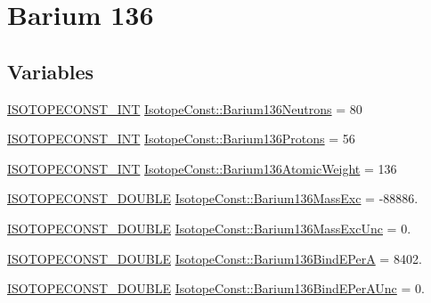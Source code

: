 \hypertarget{group___isotope_const-_barium-_ba136}{}\section{Barium 136}
\label{group___isotope_const-_barium-_ba136}
\subsection*{Variables}
\begin{DoxyCompactItemize}
\item 
\mbox{\hyperlink{group___isotope_const-_macros_ga5f18360b3e99483a35c32d789e62621c}{I\+S\+O\+T\+O\+P\+E\+C\+O\+N\+S\+T\+\_\+\+I\+NT}} \mbox{\hyperlink{group___isotope_const-_barium-_ba136_ga207ac0f945f2a6e0a3abf848dd1a6a09}{Isotope\+Const\+::\+Barium136\+Neutrons}} = 80
\item 
\mbox{\hyperlink{group___isotope_const-_macros_ga5f18360b3e99483a35c32d789e62621c}{I\+S\+O\+T\+O\+P\+E\+C\+O\+N\+S\+T\+\_\+\+I\+NT}} \mbox{\hyperlink{group___isotope_const-_barium-_ba136_ga65a9df2bdef9649c95465ae2739fdb09}{Isotope\+Const\+::\+Barium136\+Protons}} = 56
\item 
\mbox{\hyperlink{group___isotope_const-_macros_ga5f18360b3e99483a35c32d789e62621c}{I\+S\+O\+T\+O\+P\+E\+C\+O\+N\+S\+T\+\_\+\+I\+NT}} \mbox{\hyperlink{group___isotope_const-_barium-_ba136_gabeb93d4243c7403cc1426981315faddd}{Isotope\+Const\+::\+Barium136\+Atomic\+Weight}} = 136
\item 
\mbox{\hyperlink{group___isotope_const-_macros_ga8f45a7272ce02c0b4c65c44636ed719a}{I\+S\+O\+T\+O\+P\+E\+C\+O\+N\+S\+T\+\_\+\+D\+O\+U\+B\+LE}} \mbox{\hyperlink{group___isotope_const-_barium-_ba136_ga9a36b42ca0f06b1f9d0b03fad4aab920}{Isotope\+Const\+::\+Barium136\+Mass\+Exc}} = -\/88886.
\item 
\mbox{\hyperlink{group___isotope_const-_macros_ga8f45a7272ce02c0b4c65c44636ed719a}{I\+S\+O\+T\+O\+P\+E\+C\+O\+N\+S\+T\+\_\+\+D\+O\+U\+B\+LE}} \mbox{\hyperlink{group___isotope_const-_barium-_ba136_ga9cbf975602e9d19ac1d09ecc6aa51777}{Isotope\+Const\+::\+Barium136\+Mass\+Exc\+Unc}} = 0.
\item 
\mbox{\hyperlink{group___isotope_const-_macros_ga8f45a7272ce02c0b4c65c44636ed719a}{I\+S\+O\+T\+O\+P\+E\+C\+O\+N\+S\+T\+\_\+\+D\+O\+U\+B\+LE}} \mbox{\hyperlink{group___isotope_const-_barium-_ba136_gaf3b9d71a77932f628255eb4fcf1392d8}{Isotope\+Const\+::\+Barium136\+Bind\+E\+PerA}} = 8402.
\item 
\mbox{\hyperlink{group___isotope_const-_macros_ga8f45a7272ce02c0b4c65c44636ed719a}{I\+S\+O\+T\+O\+P\+E\+C\+O\+N\+S\+T\+\_\+\+D\+O\+U\+B\+LE}} \mbox{\hyperlink{group___isotope_const-_barium-_ba136_ga888e6bf4a77d7e70befd6e0e10d6f40d}{Isotope\+Const\+::\+Barium136\+Bind\+E\+Per\+A\+Unc}} = 0.

\end{DoxyCompactItemize}
